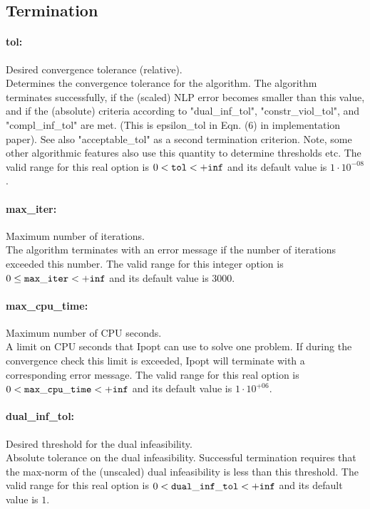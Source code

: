 \subsection{Termination}

\paragraph{tol:}\label{opt:tol} Desired convergence tolerance (relative). \\
 Determines the convergence tolerance for the algorithm.  The algorithm terminates successfully, if the (scaled) NLP error becomes smaller than this value, and if the (absolute) criteria according to "dual\_inf\_tol", "constr\_viol\_tol", and "compl\_inf\_tol" are met.  (This is epsilon\_tol in Eqn. (6) in implementation paper).  See also "acceptable\_tol" as a second termination criterion.  Note, some other algorithmic features also use this quantity to determine thresholds etc. The valid range for this real option is 
$0 <  {\tt tol } <  {\tt +inf}$
and its default value is $1 \cdot 10^{-08}$.


\paragraph{max\_iter:}\label{opt:max_iter} Maximum number of iterations. \\
 The algorithm terminates with an error message if the number of iterations exceeded this number. The valid range for this integer option is
$0 \le {\tt max\_iter } <  {\tt +inf}$
and its default value is $3000$.


\paragraph{max\_cpu\_time:}\label{opt:max_cpu_time} Maximum number of CPU seconds. \\
 A limit on CPU seconds that Ipopt can use to solve one problem.  If during the convergence check this limit is exceeded, Ipopt will terminate with a corresponding error message. The valid range for this real option is 
$0 <  {\tt max\_cpu\_time } <  {\tt +inf}$
and its default value is $1 \cdot 10^{+06}$.


\paragraph{dual\_inf\_tol:}\label{opt:dual_inf_tol} Desired threshold for the dual infeasibility. \\
 Absolute tolerance on the dual infeasibility. Successful termination requires that the max-norm of the (unscaled) dual infeasibility is less than this threshold. The valid range for this real option is 
$0 <  {\tt dual\_inf\_tol } <  {\tt +inf}$
and its default value is $1$.


